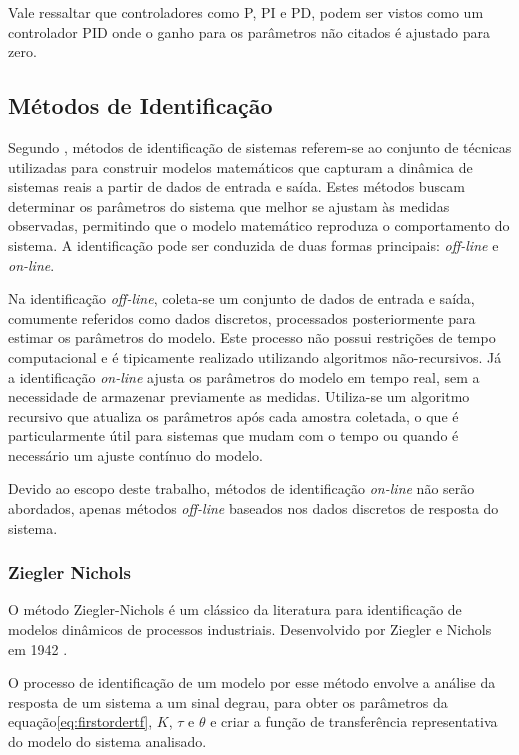 Vale ressaltar que controladores como P, PI e PD, podem ser vistos como um controlador PID onde o ganho para os
parâmetros não citados é ajustado para zero.

\subsection{Métodos de Identificação}

Segundo \cite{CoelhoIdentificacao}, métodos de identificação de sistemas referem-se ao conjunto de técnicas
utilizadas para construir modelos matemáticos que capturam a dinâmica de sistemas reais a partir de dados de entrada e
saída.
Estes métodos buscam determinar os parâmetros do sistema que melhor se ajustam às medidas observadas,
permitindo que o modelo matemático reproduza o comportamento do sistema.
A identificação pode ser conduzida de duas formas principais: \textit{off-line} e \textit{on-line}.

Na identificação \textit{off-line}, coleta-se um conjunto de dados de entrada e saída, comumente referidos como dados discretos,
processados posteriormente para estimar os parâmetros do modelo.
Este processo não possui restrições de tempo computacional e é tipicamente realizado utilizando algoritmos
não-recursivos.
Já a identificação \textit{on-line} ajusta os parâmetros do modelo em tempo real, sem a necessidade de armazenar previamente as
medidas.
Utiliza-se um algoritmo recursivo que atualiza os parâmetros após cada amostra coletada,
o que é particularmente útil para sistemas que mudam com o tempo ou quando é necessário um ajuste contínuo do modelo.

Devido ao escopo deste trabalho, métodos de identificação \textit{on-line} não serão abordados, apenas métodos \textit{off-line} baseados
nos dados discretos de resposta do sistema.

\subsubsection{Ziegler Nichols}\label{subsubsec:znfun}

O método Ziegler-Nichols é um clássico da literatura para identificação de modelos dinâmicos de
processos industriais.
Desenvolvido por Ziegler e Nichols em 1942 \cite{CoelhoIdentificacao}.

O processo de identificação de um modelo por esse método envolve a análise da resposta de um sistema a um sinal
degrau, para obter os parâmetros da equação\eqref{eq:firstordertf}, $K$, $\tau$ e $\theta$ e criar
a função de transferência representativa do modelo do sistema analisado.

